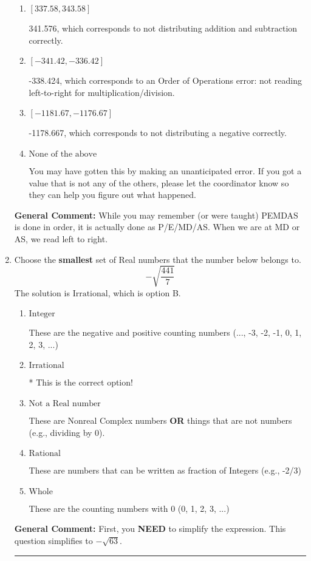 \documentclass{extbook}[14pt]
\newcommand{\litem}[1]{\item #1

\rule{\textwidth}{0.4pt}}
\begin{document}
\begin{enumerate}
{\begin{enumerate}[label=\Alph*.]
* -389.333, which is the correct option.
\item \( [337.58, 343.58] \)

 341.576, which corresponds to not distributing addition and subtraction correctly.
\item \( [-341.42, -336.42] \)

 -338.424, which corresponds to an Order of Operations error: not reading left-to-right for multiplication/division.
\item \( [-1181.67, -1176.67] \)

 -1178.667, which corresponds to not distributing a negative correctly.
\item \( \text{None of the above} \)

 You may have gotten this by making an unanticipated error. If you got a value that is not any of the others, please let the coordinator know so they can help you figure out what happened.
\end{enumerate}

\textbf{General Comment:} While you may remember (or were taught) PEMDAS is done in order, it is actually done as P/E/MD/AS. When we are at MD or AS, we read left to right.
}
\litem{
Choose the \textbf{smallest} set of Real numbers that the number below belongs to.
\[ -\sqrt{\frac{441}{7}} \]The solution is \( \text{Irrational} \), which is option B.\begin{enumerate}[label=\Alph*.]
\item \( \text{Integer} \)

These are the negative and positive counting numbers (..., -3, -2, -1, 0, 1, 2, 3, ...)
\item \( \text{Irrational} \)

* This is the correct option!
\item \( \text{Not a Real number} \)

These are Nonreal Complex numbers \textbf{OR} things that are not numbers (e.g., dividing by 0).
\item \( \text{Rational} \)

These are numbers that can be written as fraction of Integers (e.g., -2/3)
\item \( \text{Whole} \)

These are the counting numbers with 0 (0, 1, 2, 3, ...)
\end{enumerate}

\textbf{General Comment:} First, you \textbf{NEED} to simplify the expression. This question simplifies to $-\sqrt{63}$. 
 
}
\end{enumerate}
\end{document}
